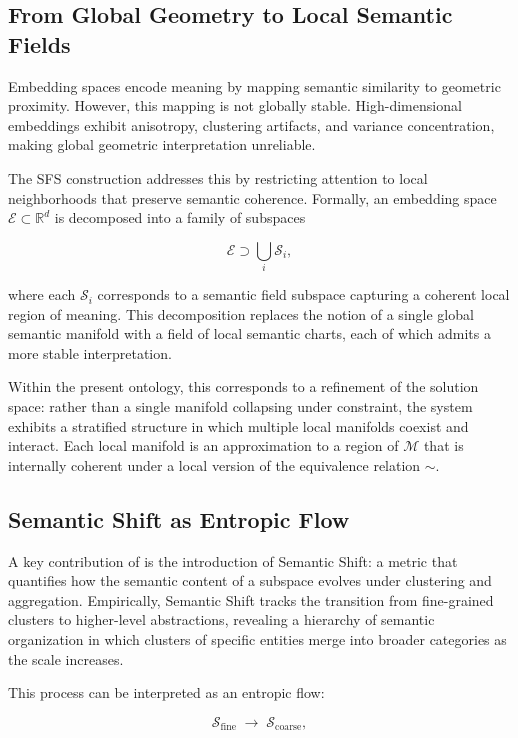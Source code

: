 \documentclass[11pt, twoside]{article}
\theoremstyle{plain}
\theoremstyle{definition}
\theoremstyle{remark}
\begin{document}
\subsection{From Global Geometry to Local Semantic Fields}

Embedding spaces encode meaning by mapping semantic similarity to geometric proximity. However, this mapping is not globally stable. High-dimensional embeddings exhibit anisotropy, clustering artifacts, and variance concentration, making global geometric interpretation unreliable.

The SFS construction addresses this by restricting attention to local neighborhoods that preserve semantic coherence. Formally, an embedding space $\mathcal{E} \subset \mathbb{R}^d$ is decomposed into a family of subspaces

\[
\mathcal{E} \supset \bigcup_i \mathcal{S}_i,
\]

where each $\mathcal{S}_i$ corresponds to a semantic field subspace capturing a coherent local region of meaning. This decomposition replaces the notion of a single global semantic manifold with a field of local semantic charts, each of which admits a more stable interpretation.

Within the present ontology, this corresponds to a refinement of the solution space: rather than a single manifold collapsing under constraint, the system exhibits a stratified structure in which multiple local manifolds coexist and interact. Each local manifold is an approximation to a region of $\mathcal{M}$ that is internally coherent under a local version of the equivalence relation $\sim$.

\subsection{Semantic Shift as Entropic Flow}

A key contribution of \cite{sun2025swallow} is the introduction of Semantic Shift: a metric that quantifies how the semantic content of a subspace evolves under clustering and aggregation. Empirically, Semantic Shift tracks the transition from fine-grained clusters to higher-level abstractions, revealing a hierarchy of semantic organization in which clusters of specific entities merge into broader categories as the scale increases.

This process can be interpreted as an entropic flow:

\[
\mathcal{S}_{\text{fine}} \;\longrightarrow\; \mathcal{S}_{\text{coarse}},
\]
\end{document}
